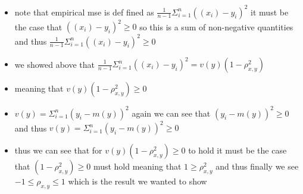 \documentclass[12pt,twoside]{article}
\begin{document}
\begin{enumerate}
\begin{enumerate}
\begin{itemize}
    \item note that empirical mse is def fined as $\frac{1}{n-1}\Sigma_{i=1}^{n}((x_i)-y_i)^2$ it must be the case that $((x_i)-y_i)^2\geq 0$ so this is a sum of non-negative quantities and thus $\frac{1}{n-1}\Sigma_{i=1}^{n}((x_i)-y_i)^2\geq 0$
    \item we showed above that $\frac{1}{n-1}\Sigma_{i=1}^{n}((x_i)-y_i)^2=v(y)(1-\rho_{x,y}^2)$
    \item meaning that $v(y)(1-\rho_{x,y}^2)\geq 0$ 
    \item $v(y)=\Sigma_{i=1}^{n}(y_i-m(y))^2$ again we can see that $(y_i-m(y))^2\geq 0$ and thus  $v(y)=\Sigma_{i=1}^{n}(y_i-m(y))^2\geq 0$
    \item thus we can see that for $v(y)(1-\rho_{x,y}^2)\geq 0$ to hold it must be the case that $(1-\rho_{x,y}^2)\geq 0$ must hold meaning that $1\geq \rho_{x,y}^2$ and thus finally we see $-1\leq \rho_{x,y}\leq 1$ which is the result we wanted to show
    
    \end{itemize}


\end{enumerate}
\end{enumerate}
\end{document}
